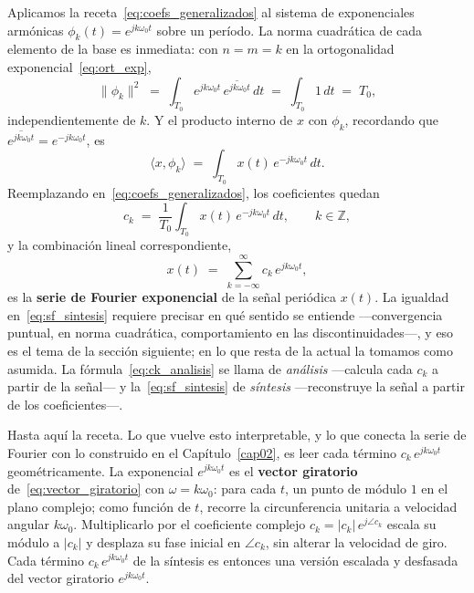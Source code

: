 \documentclass[class=book, crop=false]{standalone}
\begin{document}
Aplicamos la receta~\eqref{eq:coefs_generalizados} al sistema de
exponenciales armónicas $\phi_k(t) = e^{jk\omega_0 t}$ sobre un
período. La norma cuadrática de cada elemento de la base es inmediata:
con $n = m = k$ en la ortogonalidad exponencial~\eqref{eq:ort_exp},
\begin{equation*}
    \|\phi_k\|^2
    \;=\; \int_{T_0} e^{jk\omega_0 t}\,\overline{e^{jk\omega_0 t}}\,dt
    \;=\; \int_{T_0} 1\,dt
    \;=\; T_0,
\end{equation*}
independientemente de $k$. Y el producto interno de $x$ con $\phi_k$,
recordando que $\overline{e^{jk\omega_0 t}} = e^{-jk\omega_0 t}$, es
\begin{equation*}
    \langle x,\phi_k\rangle
    \;=\; \int_{T_0} x(t)\,e^{-jk\omega_0 t}\,dt.
\end{equation*}
Reemplazando en~\eqref{eq:coefs_generalizados}, los coeficientes
quedan
\begin{equation}
    c_k \;=\; \frac{1}{T_0}\int_{T_0} x(t)\,e^{-jk\omega_0 t}\,dt,
    \qquad k \in \mathbb{Z},
    \label{eq:ck_analisis}
\end{equation}
y la combinación lineal correspondiente,
\begin{equation}
    x(t) \;=\; \sum_{k=-\infty}^{\infty} c_k\,e^{jk\omega_0 t},
    \label{eq:sf_sintesis}
\end{equation}
es la \textbf{serie de Fourier exponencial} de la señal periódica
$x(t)$. La igualdad en~\eqref{eq:sf_sintesis} requiere precisar en
qué sentido se entiende ---convergencia puntual, en norma cuadrática,
comportamiento en las discontinuidades---, y eso es el tema de la
sección siguiente; en lo que resta de la actual la tomamos como
asumida. La fórmula~\eqref{eq:ck_analisis} se llama de \emph{análisis}
---calcula cada $c_k$ a partir de la señal--- y
la~\eqref{eq:sf_sintesis} de \emph{síntesis} ---reconstruye la señal a
partir de los coeficientes---.

Hasta aquí la receta. Lo que vuelve esto interpretable, y lo que
conecta la serie de Fourier con lo construido en el
Capítulo~\ref{cap02}, es leer cada término $c_k\,e^{jk\omega_0 t}$
geométricamente. La exponencial $e^{jk\omega_0 t}$ es el
\textbf{vector giratorio} de~\eqref{eq:vector_giratorio} con
$\omega = k\omega_0$: para cada $t$, un punto de módulo $1$ en el
plano complejo; como función de $t$, recorre la circunferencia
unitaria a velocidad angular $k\omega_0$. Multiplicarlo por el
coeficiente complejo $c_k = |c_k|\,e^{j\angle c_k}$ escala su
módulo a $|c_k|$ y desplaza su fase inicial en $\angle c_k$, sin
alterar la velocidad de giro. Cada término $c_k\,e^{jk\omega_0 t}$
de la síntesis es entonces una versión escalada y desfasada del
vector giratorio $e^{jk\omega_0 t}$.
\end{document}
